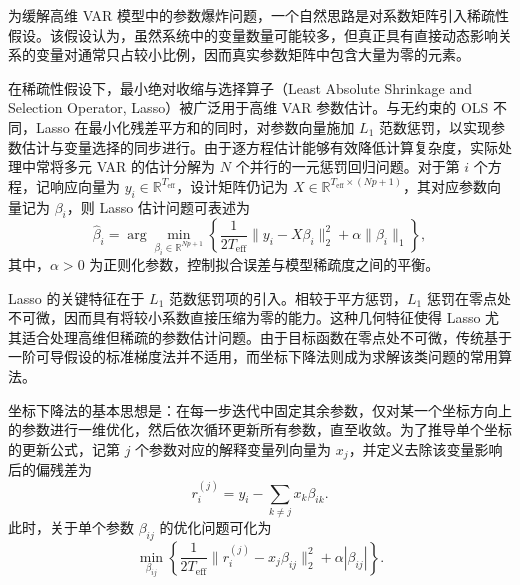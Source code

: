为缓解高维 VAR 模型中的参数爆炸问题，一个自然思路是对系数矩阵引入稀疏性假设。该假设认为，虽然系统中的变量数量可能较多，但真正具有直接动态影响关系的变量对通常只占较小比例，因而真实参数矩阵中包含大量为零的元素。

在稀疏性假设下，最小绝对收缩与选择算子（Least Absolute Shrinkage and Selection Operator, Lasso）被广泛用于高维 VAR 参数估计。与无约束的 OLS 不同，Lasso 在最小化残差平方和的同时，对参数向量施加 $L_1$ 范数惩罚，以实现参数估计与变量选择的同步进行。由于逐方程估计能够有效降低计算复杂度，实际处理中常将多元 VAR 的估计分解为 $N$ 个并行的一元惩罚回归问题。对于第 $i$ 个方程，记响应向量为 $y_i\in\mathbb{R}^{T_{\mathrm{eff}}}$，设计矩阵仍记为 $X\in\mathbb{R}^{T_{\mathrm{eff}}\times(Np+1)}$，其对应参数向量记为 $\beta_i$，则 Lasso 估计问题可表述为
\begin{equation}
 \hat{\beta}_i=\arg\min_{\beta_i\in\mathbb{R}^{Np+1}}
 \left\{
 \frac{1}{2T_{\mathrm{eff}}}\lVert y_i-X\beta_i\rVert_2^2 + \alpha\lVert\beta_i\rVert_1
 \right\},
\end{equation}
其中，$\alpha>0$ 为正则化参数，控制拟合误差与模型稀疏度之间的平衡。

Lasso 的关键特征在于 $L_1$ 范数惩罚项的引入。相较于平方惩罚，$L_1$ 惩罚在零点处不可微，因而具有将较小系数直接压缩为零的能力。这种几何特征使得 Lasso 尤其适合处理高维但稀疏的参数估计问题。由于目标函数在零点处不可微，传统基于一阶可导假设的标准梯度法并不适用，而坐标下降法则成为求解该类问题的常用算法。

坐标下降法的基本思想是：在每一步迭代中固定其余参数，仅对某一个坐标方向上的参数进行一维优化，然后依次循环更新所有参数，直至收敛。为了推导单个坐标的更新公式，记第 $j$ 个参数对应的解释变量列向量为 $x_j$，并定义去除该变量影响后的偏残差为
\begin{equation}
 r_i^{(j)}=y_i-\sum_{k\neq j}x_k\beta_{ik}.
\end{equation}
此时，关于单个参数 $\beta_{ij}$ 的优化问题可化为
\begin{equation}
 \min_{\beta_{ij}}
 \left\{
 \frac{1}{2T_{\mathrm{eff}}}\lVert r_i^{(j)}-x_j\beta_{ij}\rVert_2^2 + \alpha|\beta_{ij}|
 \right\}.
\end{equation}

